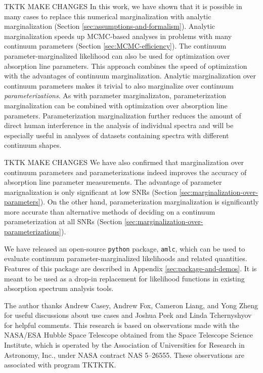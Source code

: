\documentclass[trackchanges]{aastex62}
\newcommand{\pkgname}{\texttt{amlc}}
\begin{document}
TKTK MAKE CHANGES
In this work, we have shown that it is possible in many cases to replace this numerical marginalization with analytic marginalization (Section \ref{sec:assumptions-and-formalism}).
Analytic marginalization speeds up MCMC-based analyses in problems with many continuum parameters (Section \ref{sec:MCMC-efficiency}).
The continuum parameter-marginalized likelihood can also be used for optimization over absorption line parameters.
This approach combines the speed of optimization with the advantages of continuum marginalization.
Analytic marginalization over continuum parameters makes it trivial to also marginalize over continuum \emph{parameterizations}.
As with parameter marginalizaton, parameterization marginalization can be combined with optimization over absorption line parameters.
Parameterization marginalization further reduces the amount of direct human interference in the analysis of individual spectra and will be especially useful in analyses of datasets containing spectra with different continuum shapes.

TKTK MAKE CHANGES
We have also confirmed that marginalization over continuum parameters and parameterizations indeed improves the accuracy of absorption line parameter measurements.
The advantage of parameter marignalization is only significant at low SNRs (Section \ref{sec:marginalization-over-parameters}).
On the other hand, parameterization marginalization is significantly more accurate than alternative methods of deciding on a continuum parameterization at all SNRs (Section \ref{sec:marginalization-over-parameterizations}).

We have released an open-source \texttt{python} package, \pkgname, which can be used to evaluate continuum parameter-marginalized likelihoods and related quantities.
Features of this package are described in Appendix \ref{sec:package-and-demos}.
It is meant to be used as a drop-in replacement for likelihood functions in existing absorption spectrum analysis tools.

\acknowledgments
The author thanks Andrew Casey, Andrew Fox, Cameron Liang, and Yong Zheng for useful discussions about use cases and Joshua Peek and Linda Tchernyshyov for helpful comments.
This research is based on observations made with the NASA/ESA Hubble Space Telescope obtained from the Space Telescope Science Institute, which is operated by the Association of Universities for Research in Astronomy, Inc., under NASA contract NAS 5–26555. These observations are associated with program TKTKTK.
\end{document}

